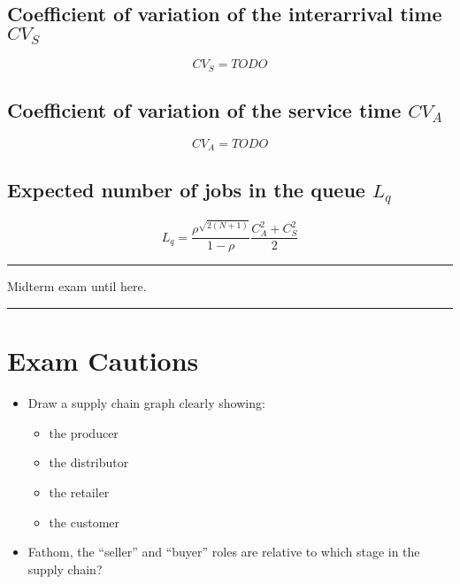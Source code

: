\documentclass[11pt]{article}
\begin{document}
\subsection{Coefficient of variation of the interarrival time $CV_S$}

\begin{equation}
    CV_S = TODO
\end{equation}

\subsection{Coefficient of variation of the service time $CV_A$}

\begin{equation}
    CV_A = TODO
\end{equation}

\subsection{Expected number of jobs in the queue $L_q$}

\begin{equation}
    L_q = \frac{\rho^{\sqrt{2(N + 1)}}}{1 - \rho} \frac{C_A^2 + C_S^2}{2}
\end{equation}

\noindent\rule[0.5ex]{\linewidth}{1pt}

Midterm exam until here.

\noindent\rule[0.5ex]{\linewidth}{1pt}

\newpage

\section{Exam Cautions}

\begin{itemize}
    \item Draw a supply chain graph clearly showing:\begin{itemize}
        \item the producer
        \item the distributor
        \item the retailer
        \item the customer
    \end{itemize}
    \item Fathom, the ``seller'' and ``buyer'' roles are relative to which stage in the supply chain?
\end{itemize}
\end{document}
